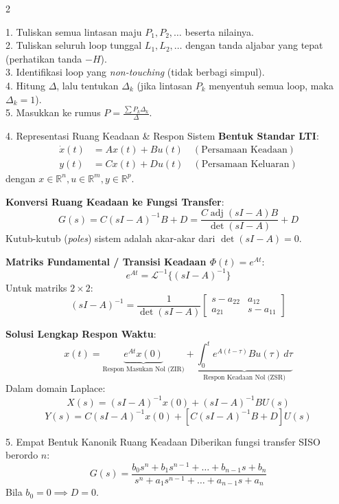 \documentclass[10pt,a4paper]{article}
\begin{document}
\begin{multicols*}{2}
\begin{tipbox}
1. Tuliskan semua lintasan maju $P_1, P_2, \dots$ beserta nilainya.\\
2. Tuliskan seluruh loop tunggal $L_1, L_2, \dots$ dengan tanda aljabar yang tepat (perhatikan tanda $-H$).\\
3. Identifikasi loop yang \textit{non-touching} (tidak berbagi simpul).\\
4. Hitung $\Delta$, lalu tentukan $\Delta_k$ (jika lintasan $P_k$ menyentuh semua loop, maka $\Delta_k = 1$).\\
5. Masukkan ke rumus $P = \frac{\sum P_k \Delta_k}{\Delta}$.
\end{tipbox}

\begin{rumusbox}{4. Representasi Ruang Keadaan \& Respon Sistem}
\textbf{Bentuk Standar LTI}:
\begin{align*}
    \dot{x}(t) &= A x(t) + B u(t) \quad (\text{Persamaan Keadaan})\\
    y(t) &= C x(t) + D u(t) \quad (\text{Persamaan Keluaran})
\end{align*}
dengan $x \in \mathbb{R}^n, u \in \mathbb{R}^m, y \in \mathbb{R}^p$.

\textbf{Konversi Ruang Keadaan ke Fungsi Transfer}:
$$G(s) = C(sI - A)^{-1} B + D = \frac{C \operatorname{adj}(sI - A) B}{\det(sI - A)} + D$$
Kutub-kutub (\textit{poles}) sistem adalah akar-akar dari $\det(sI - A) = 0$.

\textbf{Matriks Fundamental / Transisi Keadaan $\Phi(t) = e^{At}$}:
$$e^{At} = \mathcal{L}^{-1}\{(sI - A)^{-1}\}$$
Untuk matriks $2 \times 2$:
$$(sI - A)^{-1} = \frac{1}{\det(sI - A)} \begin{bmatrix} s - a_{22} & a_{12} \\ a_{21} & s - a_{11} \end{bmatrix}$$

\textbf{Solusi Lengkap Respon Waktu}:
$$x(t) = \underbrace{e^{At} x(0)}_{\text{Respon Masukan Nol (ZIR)}} + \underbrace{\int_0^t e^{A(t-\tau)} B u(\tau) \, d\tau}_{\text{Respon Keadaan Nol (ZSR)}}$$
Dalam domain Laplace:
$$X(s) = (sI - A)^{-1} x(0) + (sI - A)^{-1} B U(s)$$
$$Y(s) = C(sI - A)^{-1} x(0) + \left[ C(sI - A)^{-1} B + D \right] U(s)$$
\end{rumusbox}

\begin{rumusbox}{5. Empat Bentuk Kanonik Ruang Keadaan}
Diberikan fungsi transfer SISO berordo $n$:
$$G(s) = \frac{b_0 s^n + b_1 s^{n-1} + \dots + b_{n-1}s + b_n}{s^n + a_1 s^{n-1} + \dots + a_{n-1}s + a_n}$$
Bila $b_0 = 0 \implies D = 0$.


\end{rumusbox}
\end{multicols*}
\end{document}
